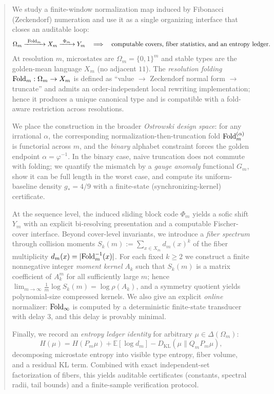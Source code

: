 \begin{abstract}
We study a finite-window normalization map induced by Fibonacci (Zeckendorf) numeration and use it as a single organizing interface that closes an auditable loop:
\[
\Omega_m \xrightarrow{\ \Fold_m\ } X_m \xrightarrow{\ \Phi_m\ } Y_m
\quad\Longrightarrow\quad
\text{computable covers, fiber statistics, and an entropy ledger}.
\]
At resolution $m$, microstates are $\Omega_m=\{0,1\}^m$ and stable types are the golden-mean language $X_m$ (no adjacent $11$).
The \emph{resolution folding} $\Fold_m:\Omega_m\to X_m$ is defined as ``value $\to$ Zeckendorf normal form $\to$ truncate'' and admits an order-independent local rewriting implementation; hence it produces a unique canonical type and is compatible with a fold-aware restriction across resolutions.
\par
We place the construction in the broader \emph{Ostrowski design space}: for any irrational $\alpha$, the corresponding normalization-then-truncation fold $\Fold_m^{(\alpha)}$ is functorial across $m$, and the \emph{binary} alphabet constraint forces the golden endpoint $\alpha=\varphi^{-1}$.
In the binary case, naive truncation does not commute with folding; we quantify the mismatch by a \emph{gauge anomaly} functional $G_m$, show it can be full length in the worst case, and compute its uniform-baseline density $g_\ast=4/9$ with a finite-state (synchronizing-kernel) certificate.
\par
At the sequence level, the induced sliding block code $\Phi_m$ yields a sofic shift $Y_m$ with an explicit bi-resolving presentation and a computable Fischer-cover interface.
Beyond cover-level invariants, we introduce a \emph{fiber spectrum} through collision moments
\(
S_k(m):=\sum_{x\in X_m} d_m(x)^k
\)
of the fiber multiplicity $d_m(x)=|\Fold_m^{-1}(x)|$.
For each fixed $k\ge 2$ we construct a finite nonnegative integer \emph{moment kernel} $A_k$ such that $S_k(m)$ is a matrix coefficient of $A_k^m$ for all sufficiently large $m$; hence $\lim_{m\to\infty}\frac{1}{m}\log S_k(m)=\log\rho(A_k)$, and a symmetry quotient yields polynomial-size compressed kernels.
We also give an explicit \emph{online} normalizer: $\Fold_\infty$ is computed by a deterministic finite-state transducer with delay $3$, and this delay is provably minimal.
\par
Finally, we record an \emph{entropy ledger identity} for arbitrary $\mu\in\Delta(\Omega_m)$:
\[
H(\mu)=H(P_m\mu)+\mathbb{E}[\log d_m]-D_{\mathrm{KL}}(\mu\|Q_mP_m\mu),
\]
decomposing microstate entropy into visible type entropy, fiber volume, and a residual KL term. Combined with exact independent-set factorization of fibers, this yields auditable certificates (constants, spectral radii, tail bounds) and a finite-sample verification protocol.
\end{abstract}

